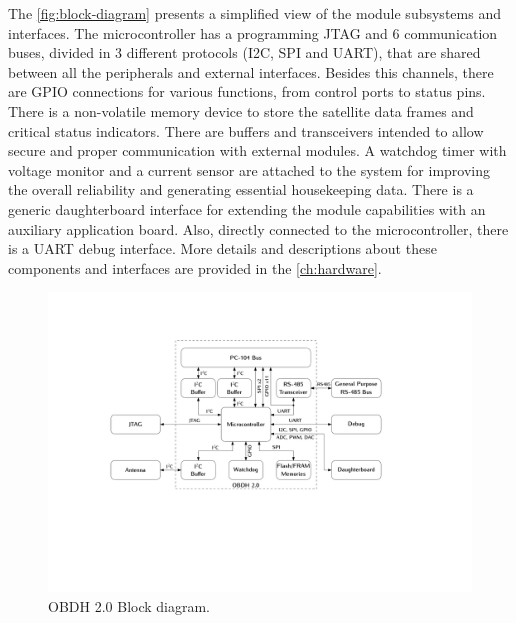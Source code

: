 The \autoref{fig:block-diagram} presents a simplified view of the module subsystems and interfaces. The microcontroller has a programming JTAG
 and 6 communication buses, divided in 3 different protocols (I2C, SPI and UART), that are shared between all the peripherals and external interfaces. Besides this channels, there are GPIO connections for various functions, from control ports to status pins. There is a non-volatile memory device to store the satellite data frames and critical status indicators. There are buffers and transceivers intended to allow secure and proper communication with external modules. A watchdog timer with voltage monitor and a current sensor are attached to the system for improving the overall reliability and generating essential housekeeping data. There is a generic daughterboard interface for extending the module capabilities with an auxiliary application board. Also, directly connected to the microcontroller, there is a UART debug interface. More details and descriptions about these components and interfaces are provided in the \autoref{ch:hardware}.

\begin{figure}[!ht]
    \begin{center}
        \includegraphics[width=\textwidth]{figures/block_diagram.pdf}
        \caption{OBDH 2.0 Block diagram.}
        \label{fig:block-diagram}
    \end{center}
\end{figure}

